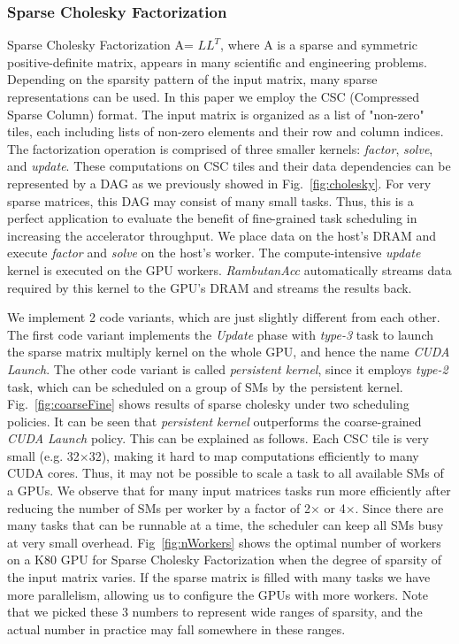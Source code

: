 \subsubsection{Sparse Cholesky Factorization}
Sparse Cholesky Factorization A= $LL^T$, where A is a sparse and symmetric positive-definite matrix,
appears in many scientific and engineering problems.
Depending on the sparsity pattern of the input matrix, many sparse representations can be used.
In this paper we employ the CSC (Compressed Sparse Column) format. 
The input matrix is organized as a list of "non-zero" tiles, each including lists of non-zero elements and their row and column indices.
The factorization operation is comprised of three smaller kernels: {\em factor}, {\em solve}, and {\em update}.
These computations on CSC tiles and their data dependencies can be represented by a DAG as we previously showed in Fig.~\ref{fig:cholesky}. 
For very sparse matrices, this DAG may consist of many small tasks.
Thus, this is a perfect application to evaluate the benefit of fine-grained task scheduling in increasing the accelerator throughput.
We place data on the host's DRAM and execute {\em factor} and {\em solve} on the host's worker.
The compute-intensive {\em update} kernel is executed on the GPU workers.
{\em RambutanAcc} automatically streams data required by this kernel to the GPU's DRAM and streams the results back.

We implement 2 code variants, which are just slightly different from each other.
The first code variant implements the {\em Update} phase with {\em type-3} task to launch the sparse matrix multiply kernel on the whole GPU, and hence the name {\em CUDA Launch}.
The other code variant is called {\em persistent kernel}, since it employs {\em type-2} task, which can be scheduled on a group of SMs by the persistent kernel. 
Fig.~\ref{fig:coarseFine} shows results of sparse cholesky under two scheduling policies.
It can be seen that {\em persistent kernel} outperforms the coarse-grained {\em CUDA Launch} policy.
This can be explained as follows.
Each CSC tile is very small (e.g. 32$\times$32), making it hard to map computations efficiently to many CUDA cores.
Thus, it may not be possible to scale a task to all available SMs of a GPUs.
We observe that for many input matrices tasks run more efficiently after reducing the number of SMs per worker by a factor of 2$\times$ or 4$\times$.
Since there are many tasks that can be runnable at a time, the scheduler can keep all SMs busy at very small overhead.
Fig~\ref{fig:nWorkers} shows the optimal number of workers on a K80 GPU for Sparse Cholesky Factorization when the degree of sparsity of the input matrix varies.
If the sparse matrix is filled with many tasks we have more parallelism, allowing us to configure the GPUs with more workers.
Note that we picked these 3 numbers to represent wide ranges of sparsity, and the actual number in practice may fall somewhere in these ranges. 


